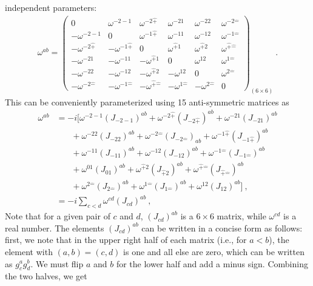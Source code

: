 \documentclass[]{article}
\numberwithin{equation}{section}
\begin{document}
{{independent parameters:
\begin{align}
    \omega^{ab}=\begin{pmatrix}
     0&\omega^{-2-1}&\omega^{-2\hat{+}}&\omega^{-21}&\omega^{-22}&\omega^{-2\hat{-}}\\
     -\omega^{-2-1}&0&\omega^{-1\hat{+}}&\omega^{-11}&\omega^{-12}&\omega^{-1\hat{-}}\\
    -\omega^{-2\hat{+}}&-\omega^{-1\hat{+}}&0&\omega^{\hat{+}1}&\omega^{\hat{+}2}&\omega^{\hat{+}\hat{-}}\\
    -\omega^{-21}&-\omega^{-11}&-\omega^{\hat{+}1}&0&\omega^{12}&\omega^{1\hat{-}}\\
    -\omega^{-22}&-\omega^{-12}&-\omega^{\hat{+}2}&-\omega^{12}&0&\omega^{2\hat{-}}\\
    -\omega^{-2\hat{-}}&-\omega^{-1\hat{-}}&-\omega^{\hat{+}\hat{-}}&-\omega^{1\hat{-}}&-\omega^{2\hat{-}}&0
\end{pmatrix}_{(6\times6)}~.
\end{align}
This can be conveniently parameterized using 15 anti-symmetric matrices as
\begin{align}
    \omega^{ab}&=-i\bigg[\omega^{-2-1}(J_{-2-1})^{ab}+\omega^{-2\hat{+}}(J_{-2\hat{+}})^{ab}+\omega^{-21}(J_{-21})^{ab}\nonumber\\
    &~~~~~~~~+\omega^{-22}(J_{-22})^{ab}+\omega^{-2\hat{-}}(J_{-2\hat{-}})_{ab}+\omega^{-1\hat{+}}(J_{-1\hat{+}})^{ab}\nonumber\\
    &~~~~~~~~+\omega^{-11}(J_{-11})^{ab}+\omega^{-12}(J_{-12})^{ab}+\omega^{-1\hat{-}}(J_{-1\hat{-}})^{ab}\nonumber\\
    &~~~~~~~~+\omega^{01}(J_{01})^{ab}+\omega^{\hat{+}2}(J_{\hat{+}2})^{ab}+\omega^{\hat{+}\hat{-}}(J_{\hat{+}\hat{-}})^{ab}\nonumber\\
    &~~~~~~~~+\omega^{2\hat{-}}(J_{2\hat{-}})^{ab}+\omega^{1\hat{-}}(J_{1\hat{-}})^{ab}+\omega^{12}(J_{12})^{ab}\bigg]~,\nonumber\\
    &=-i\sum_{c<d}\omega^{cd}(J_{cd})^{ab}\label{1.84}~,
\end{align}
Note that for a given pair of $c$ and $d$, $(J_{cd})^{ab}$ is a $6\times6$ matrix, while $\omega^{cd}$ is a real number. The elements $(J_{cd})^{ab}$ can be written in a concise form as follows: first, we note that in the upper right half of each matrix (i.e., for $a < b$), the element with $(a, b) = (c,d)$ is one and all else are zero, which can be written as $g_c^a g_d^b$. We must flip $a$ and $b$ for the lower half and add a minus sign. Combining the two halves, we get
\begin{align}

\end{align}}}
\end{document}
